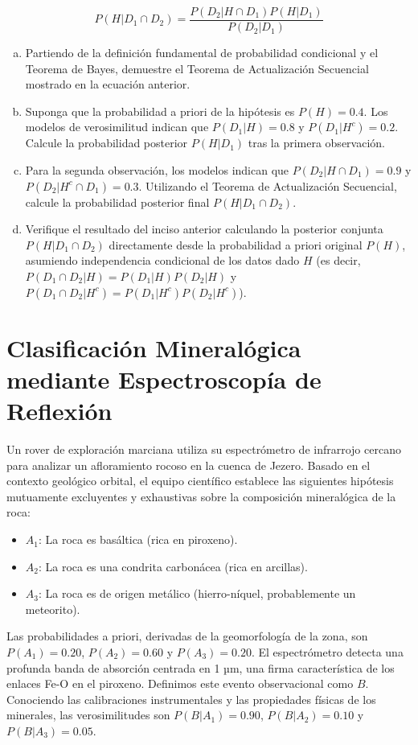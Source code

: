 \documentclass[a4paper]{article}
\begin{document}
$$
P(H|D_1 \cap D_2) = \frac{P(D_2|H \cap D_1)P(H|D_1)}{P(D_2|D_1)}
$$

\begin{enumerate}[a)]
\item Partiendo de la definición fundamental de probabilidad condicional y el Teorema de Bayes, demuestre el Teorema de Actualización Secuencial mostrado en la ecuación anterior.
\item Suponga que la probabilidad a priori de la hipótesis es $P(H) = 0.4$. Los modelos de verosimilitud indican que $P(D_1|H) = 0.8$ y $P(D_1|H^c) = 0.2$. Calcule la probabilidad posterior $P(H|D_1)$ tras la primera observación.
\item Para la segunda observación, los modelos indican que $P(D_2|H \cap D_1) = 0.9$ y $P(D_2|H^c \cap D_1) = 0.3$. Utilizando el Teorema de Actualización Secuencial, calcule la probabilidad posterior final $P(H|D_1 \cap D_2)$.
\item Verifique el resultado del inciso anterior calculando la posterior conjunta $P(H|D_1 \cap D_2)$ directamente desde la probabilidad a priori original $P(H)$, asumiendo independencia condicional de los datos dado $H$ (es decir, $P(D_1 \cap D_2|H) = P(D_1|H)P(D_2|H)$ y $P(D_1 \cap D_2|H^c) = P(D_1|H^c)P(D_2|H^c)$).
\end{enumerate}

\section{Clasificación Mineralógica mediante Espectroscopía de Reflexión}
\label{sec:problema-21}

Un rover de exploración marciana utiliza su espectrómetro de infrarrojo cercano para analizar un afloramiento rocoso en la cuenca de Jezero. Basado en el contexto geológico orbital, el equipo científico establece las siguientes hipótesis mutuamente excluyentes y exhaustivas sobre la composición mineralógica de la roca:

\begin{itemize}
\item $A_1$: La roca es basáltica (rica en piroxeno).
\item $A_2$: La roca es una condrita carbonácea (rica en arcillas).
\item $A_3$: La roca es de origen metálico (hierro-níquel, probablemente un meteorito).
\end{itemize}

Las probabilidades a priori, derivadas de la geomorfología de la zona, son $P(A_1) = 0.20$, $P(A_2) = 0.60$ y $P(A_3) = 0.20$. El espectrómetro detecta una profunda banda de absorción centrada en 1 µm, una firma característica de los enlaces Fe-O en el piroxeno. Definimos este evento observacional como $B$. Conociendo las calibraciones instrumentales y las propiedades físicas de los minerales, las verosimilitudes son $P(B|A_1) = 0.90$, $P(B|A_2) = 0.10$ y $P(B|A_3) = 0.05$.
\end{document}

